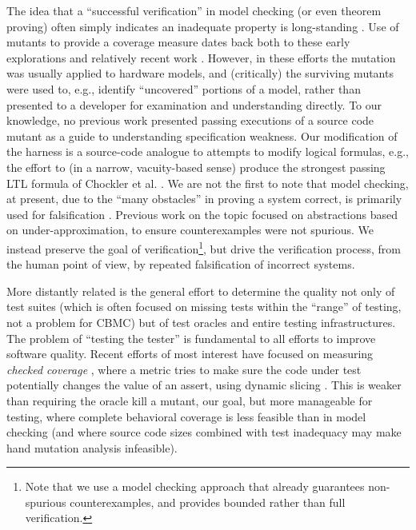 \documentclass{svjour3}
\begin{document}
The idea that a ``successful verification'' in model checking (or even
 theorem proving) often simply indicates an inadequate property is
long-standing \cite{PracticalCov,Hoskote}. Use of mutants
\cite{MutSpec,MutCov} to provide a coverage measure dates back both to
these early explorations and relatively recent work \cite{MutTheory,Arbiters,MutInterp}.
However, in these efforts the mutation was usually applied to hardware
models, and (critically) the surviving mutants were used to, e.g., identify
``uncovered'' portions of a model, rather than presented to a
developer for examination and understanding directly.  To our
knowledge, no previous work presented passing executions of a source
code mutant as a guide to understanding specification weakness.  Our
modification of the harness is a source-code analogue to attempts to
modify logical formulas, e.g., the effort to (in a narrow,
vacuity-based sense) produce the strongest passing LTL formula
of Chockler et al. \cite{BeyondVac}.  We are not the first to note
that model checking, at present, due to the ``many obstacles'' in
proving a system correct, is primarily used for falsification
\cite{AbsFals}.  Previous work on the topic \cite{AbsFals} focused on
abstractions based on under-approximation, to ensure counterexamples
were not spurious. We instead preserve the goal of
verification\footnote{Note that we use a model checking approach that
  already guarantees non-spurious counterexamples, and provides
  bounded rather than full verification.}, but drive the verification
process, from the human point of view, by repeated falsification of
incorrect systems.

More distantly related is the general effort to determine the quality
not only of test suites (which is often focused on missing tests
within the ``range'' of testing, not a problem for CBMC) but of test
oracles and entire testing infrastructures.  The problem of ``testing
the tester'' \cite{WODA09} is fundamental to all efforts
to improve software quality.  Recent efforts of most interest have
focused on measuring \emph{checked coverage} \cite{CheckedCov,CheckedJournal,ThereYet}, where
a metric tries to make sure the code under test potentially changes
the value of an assert, using dynamic slicing \cite{DynSlice,Tip}.  This is weaker than requiring the oracle kill
a mutant, our goal, but more manageable for testing, where complete
behavioral coverage is less feasible than in model checking (and where
source code sizes combined with test inadequacy may make hand mutation analysis infeasible).
\end{document}
